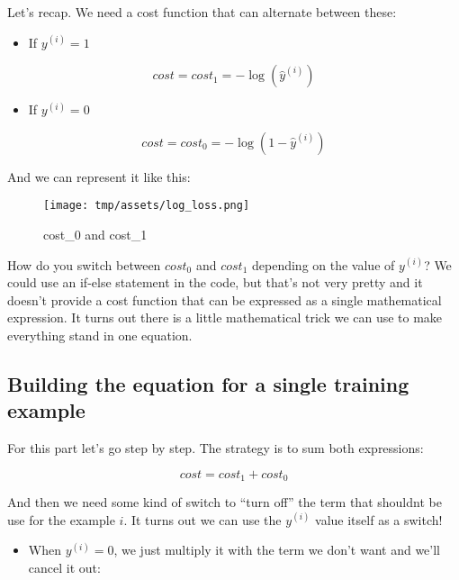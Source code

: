 \documentclass[]{article}
\providecommand{\tightlist}{%
  \setlength{\itemsep}{0pt}\setlength{\parskip}{0pt}}
\begin{document}
Let's recap. We need a cost function that can alternate between these:

\begin{itemize}
\tightlist
\item
  If \(y^{(i)} = 1\)
\end{itemize}

\large

\[
cost = cost_1 = -\log(\hat{y}^{(i)})
\] \normalsize

\begin{itemize}
\tightlist
\item
  If \(y^{(i)} = 0\)
\end{itemize}

\large

\[
cost = cost_0 = -\log(1- \hat{y}^{(i)})
\] \normalsize

And we can represent it like this:

\begin{figure}
\centering
\texttt{[image: tmp/assets/log\_loss.png]}
\caption{cost\_0 and cost\_1}
\end{figure}

How do you switch between \(cost_0\) and \(cost_1\) depending on the
value of \(y^{(i)}\)? We could use an if-else statement in the code, but
that's not very pretty and it doesn't provide a cost function that can
be expressed as a single mathematical expression. It turns out there is
a little mathematical trick we can use to make everything stand in one
equation.

\hypertarget{building-the-equation-for-a-single-training-example}{%
\subsection{Building the equation for a single training
example}\label{building-the-equation-for-a-single-training-example}}

For this part let's go step by step. The strategy is to sum both
expressions:

\large

\[
cost = cost_1 + cost_0
\] \normalsize

And then we need some kind of switch to ``turn off'' the term that
shouldnt be use for the example \(i\). It turns out we can use the
\(y^{(i)}\) value itself as a switch!

\begin{itemize}
\tightlist
\item
  When \(y^{(i)} = 0\), we just multiply it with the term we don't want
  and we'll cancel it out:
\end{itemize}
\end{document}
